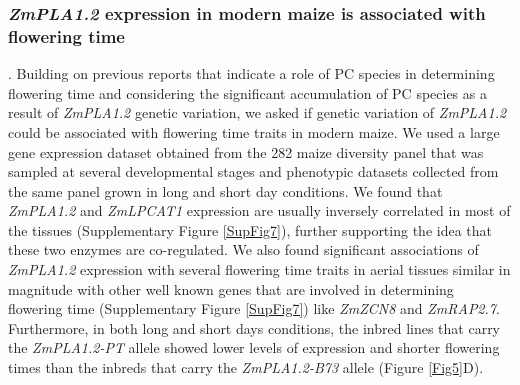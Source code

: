 \documentclass[9pt,twocolumn,twoside,lineno]{BioRxiv}
\begin{document}
 
\subsubsection{\textit{ZmPLA1.2} expression in modern maize is associated with flowering time}. 
Building on previous reports that indicate a role of PC species in determining flowering time \cite{Nakamura2014-qf, Riedelsheimer2013-bd} and considering the significant accumulation of PC species as a result of \textit{ZmPLA1.2} genetic variation, we asked if genetic variation of \textit{ZmPLA1.2} could be associated with flowering time traits in modern maize. 
We used a large gene expression dataset obtained from the 282 maize diversity panel that was sampled at several developmental stages \cite{Kremling2018-gn} and phenotypic datasets collected from the same panel grown in long and short day conditions. 
We found that \textit{ZmPLA1.2} and \textit{ZmLPCAT1} expression are usually inversely correlated in most of the tissues (Supplementary Figure \ref{SupFig7}), further supporting the idea that these two enzymes are co-regulated. 
We also found significant associations of \textit{ZmPLA1.2} expression with several flowering time traits in aerial tissues similar in magnitude with other well known genes that are involved in determining flowering time (Supplementary Figure \ref{SupFig7}) like \textit{ZmZCN8} and \textit{ZmRAP2.7}.
Furthermore, in both long and short days conditions, the inbred lines that carry the \textit{ZmPLA1.2-PT} allele showed lower levels of expression and shorter flowering times than the inbreds that carry the \textit{ZmPLA1.2-B73} allele  (Figure \ref{Fig5}D). 
\end{document}
